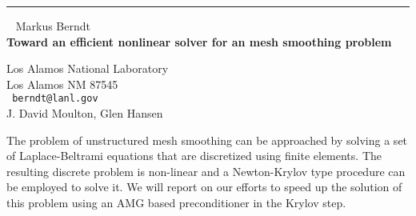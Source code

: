 \documentclass{report}
\begin{document}
\begin{center}

\rule{6in}{1pt} \
{\large
Markus Berndt
\\ {\bf
Toward an efficient nonlinear solver for an mesh smoothing problem
}}

Los Alamos National Laboratory
\\
Los Alamos NM 87545
\\ {\tt
berndt@lanl.gov
}
\\
J. David Moulton, Glen Hansen
\end{center}

The problem of unstructured mesh smoothing can be approached by solving
a set of Laplace-Beltrami equations that are discretized using finite
elements. The resulting discrete problem is non-linear and a
Newton-Krylov type procedure can be employed to solve it. We will
report on our efforts to speed up the solution of this problem using an
AMG based preconditioner in the Krylov step.
\end{document}
